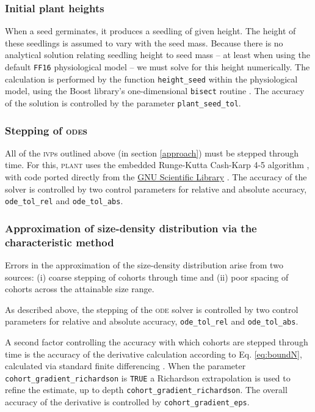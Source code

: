 \documentclass[10pt,twoside]{article}
\newcommand{\plant}{\textsc{plant}}
\begin{document}
\subsubsection{Initial plant heights}\label{initial-height-of-plants}

When a seed germinates, it produces a seedling of given height. The
height of these seedlings is assumed to vary with the seed mass.
Because there is no analytical solution relating seedling height to seed
mass -- at least when using the default \texttt{FF16} physiological model -- we must solve
for this height numerically. The calculation is performed by the function
\texttt{height\_seed} within the physiological model, using the Boost
library's one-dimensional \texttt{bisect} routine
\citep{Schaling-2014, Eddelbuettel-2015}. The accuracy of the solution
is controlled by the parameter \texttt{plant\_seed\_tol}.

\subsubsection{Stepping of \textsc{ode}s}

All of the \textsc{ivp}s outlined above (in section \ref{approach}) must be stepped through time.
For this, {\plant} uses
the embedded Runge-Kutta Cash-Karp 4-5 algorithm \citep{Cash-1990}, with
code ported directly from the
\href{http://www.gnu.org/software/gsl/}{GNU Scientific Library}
\citep{Galassi-2009}. The accuracy of the solver is controlled by two
control parameters for relative and absolute accuracy,
\texttt{ode\_tol\_rel} and \texttt{ode\_tol\_abs}.

\subsubsection{Approximation of size-density distribution via the characteristic method}
\label{approximation-of-size-density-distribution-via-the-ebt}

Errors in the approximation of the size-density distribution arise from two sources:
(i) coarse stepping of cohorts through time and
(ii) poor spacing of cohorts across the attainable size range.

As described above, the stepping of the \textsc{ode} solver is controlled by two
control parameters for relative and absolute accuracy,
\texttt{ode\_tol\_rel} and \texttt{ode\_tol\_abs}.

A second factor controlling the accuracy with which cohorts are stepped
through time is the accuracy of the derivative calculation according to Eq.
\ref{eq:boundN}, calculated via standard finite differencing
\citep{Abramowitz-2012}. When the parameter
\texttt{cohort\_gradient\_richardson} is \texttt{TRUE} a Richardson extrapolation
\citep{Stoer-2002} is used to refine the estimate, up to depth
\texttt{cohort\_gradient\_richardson}. The overall accuracy of the
derivative is controlled by \texttt{cohort\_gradient\_eps}.
\end{document}
